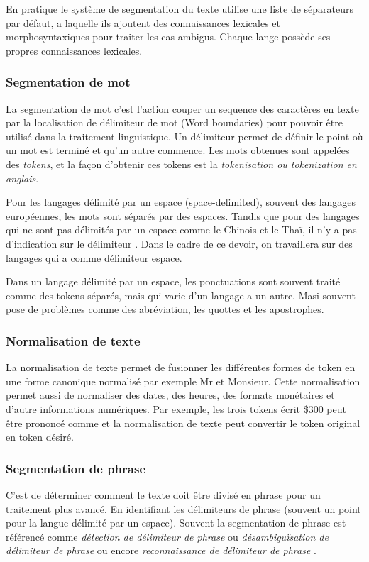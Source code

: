 En pratique le système de segmentation du texte utilise une liste de séparateurs par défaut, a laquelle ils ajoutent des connaissances lexicales et morphosyntaxiques pour traiter les cas ambigus. Chaque lange possède ses propres connaissances lexicales.

\subsubsection*{Segmentation de mot}
La segmentation de mot c'est l'action couper un sequence des caractères en texte par la localisation de délimiteur de mot (Word boundaries) pour pouvoir être utilisé dans la traitement linguistique. Un délimiteur permet de définir le point où un mot est terminé et qu'un autre commence. Les mots obtenues sont appelées des \textit{tokens}, et la façon d'obtenir ces tokens est la \textit{tokenisation ou tokenization en anglais}. \citep{handbook-nlp}

Pour les langages délimité par un espace (space-delimited), souvent des langages européennes, les mots sont séparés par des espaces. Tandis que pour des langages qui ne sont pas délimités par un espace comme le Chinois et le Thaï, il n'y a pas d'indication sur le délimiteur \citep{handbook-nlp}. Dans le cadre de ce devoir, on travaillera sur des langages qui a comme délimiteur espace.

Dans un langage délimité par un espace, les ponctuations sont souvent traité comme des tokens séparés, mais qui varie d'un langage a un autre. Masi souvent pose de problèmes comme des abréviation, les quottes et les apostrophes. \citep{handbook-nlp}

\subsubsection*{Normalisation de texte}
La normalisation de texte permet de fusionner les différentes formes de token en une forme canonique normalisé par exemple Mr et Monsieur. Cette normalisation permet aussi de normaliser des dates, des heures, des formats monétaires et d'autre informations numériques. Par exemple, les trois tokens écrit \$300 peut être prononcé comme  \fg{} et la normalisation de texte peut convertir le token original en token désiré. \citep{handbook-nlp}

\subsubsection*{Segmentation de phrase}
C'est de déterminer comment le texte doit être divisé en phrase pour un traitement plus avancé. En identifiant les délimiteurs de phrase (souvent un point pour la langue délimité par un espace). Souvent la segmentation de phrase est référencé comme \textit{détection de délimiteur de phrase} ou \textit{désambiguïsation de délimiteur de phrase} ou encore \textit{reconnaissance de délimiteur de phrase} \citep{handbook-nlp}.

